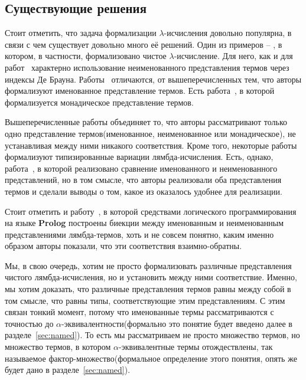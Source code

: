 \subsection{Существующие решения}

Стоит отметить, что задача формализации $\lambda$-исчисления довольно популярна, в связи с чем существует довольно много её решений. Один из примеров -- \cite{lambdaForm}, в котором, в частности, формализовано чистое $\lambda$-исчисление. Для него, как и для работ~\cite{shankar1988mechanical, altenkirch1993formalization, barras1996coq, nipkow1996more, huet1994residual} характерно использование неименованного представления термов через индексы Де Брауна. Работы~\cite{mckinna1999some, coquand1996algorithm, gabbay1999new, gordon1996five, sato1983theory, stoughton1988substitution} отличаются, от вышеперечисленных тем, что авторы формализуют именованное представление термов. Есть работа~\cite{altenkirch1999monadic}, в которой формализуется монадическое представление термов.

Вышеперечисленные работы объединяет то, что авторы рассматривают только одно представление термов(именованное, неименованное или монадическое), не устанавливая между ними никакого соответствия. Кроме того, некоторые работы формализуют типизированные вариации лямбда-исчисления. Есть, однако, работа~\cite{berghofer2007head}, в которой реализовано сравнение именованного и неименованного представлений, но в том смысле, что авторы реализовали оба представления термов и сделали выводы о том, какое из оказалось удобнее для реализации.

Стоит отметить и работу~\cite{tarau2015logic}, в которой средствами логического программирования на языке \textbf{Prolog} построены биекции между именованным и неименованным представлениями лямбда-термов, хоть и не совсем понятно, каким именно образом авторы показали, что эти соответствия взаимно-обратны.

Мы, в свою очередь, хотим не просто формализовать различные представления чистого лямбда-исчисления, но и установить между ними соответствие. Именно, мы хотим доказать, что различные представления термов равны между собой в том смысле, что равны типы, соответствующие этим представлениям. С этим связан тонкий момент, потому что именованные термы рассматриваются с точностью до $\alpha$-эквивалентности(формально это понятие будет введено далее в разделе~\ref{sec:named}). То есть мы рассматриваем не просто множество термов, но множество термов, в котором $\alpha$-эквивалентные термы отождествлены, так называемое фактор-множество(формальное определение этого понятия, опять же будет дано в разделе~\ref{sec:named}).

